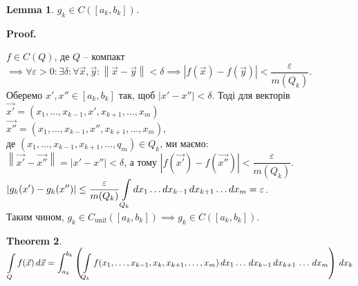\documentclass[a4paper, 10pt]{article}
\makeatletter
\def\qed{$\blacksquare$}
\theoremstyle{theoremdd}
\newtheorem{theorem}{Theorem}[subsection]
\theoremstyle{theoremdd}
\theoremstyle{theoremdd}
\theoremstyle{theoremdd}
\theoremstyle{theoremdd}
\theoremstyle{theoremdd}
\theoremstyle{theoremdd}
\newtheorem{lemma}[theorem]{Lemma}
\theoremstyle{theoremdd}
\renewenvironment{proof}[1][Proof.\\]{\par
\pushQED{\hfill \qed}%
\normalfont \topsep6\p@\@plus6\p@\relax
\trivlist
\item\relax
{\bfseries
#1\@addpunct{.}}\hspace\labelsep\ignorespaces
}{%
\popQED\endtrivlist\@endpefalse
}
\newcommand\Norm[1]{\left\lVert#1\right\rVert}
\makeatother
\begin{document}
\begin{lemma}
$g_k \in C([a_k,b_k])$.
\end{lemma}

\begin{proof}
$f \in C(Q)$, де $Q$ -- компакт $\implies \forall \varepsilon > 0: \exists \delta: \forall \vec{x}, \vec{y}: \Norm{\vec{x} - \vec{y}} < \delta \implies |f(\vec{x}) - f(\vec{y})| < \dfrac{\varepsilon}{m(Q_k)}$.\\
Оберемо $x',x'' \in [a_k,b_k]$ так, щоб $|x'-x''|<\delta$. Тоді для векторів\\
$\vec{x'} = (x_1,\dots,x_{k-1},x',x_{k+1},\dots,x_m)$\\
$\vec{x''} = (x_1,\dots,x_{k-1},x'',x_{k+1},\dots,x_m)$,\\
де $(x_1,\dots,x_{k-1},x_{k+1},\dots,q_m) \in Q_k$, ми маємо:\\
$\Norm{\vec{x'} - \vec{x''}} = |x'-x''| < \delta$, а тому $|f(\vec{x'}) - f(\vec{x''})| < \dfrac{\varepsilon}{m(Q_k)}$.\\
$\displaystyle |g_k(x') - g_k(x'')| \leq \dfrac{\varepsilon}{m(Q_k)} \int\displaylimits_{Q_k} dx_1\dots dx_{k-1}\,dx_{k+1}\dots dx_m = \varepsilon$.\\
Таким чином, $g_k \in C_{\text{unif}}([a_k,b_k]) \implies g_k \in C([a_k,b_k])$.
\end{proof}

\begin{theorem}
$\displaystyle\int\displaylimits_Q f(\vec{x})\,d\vec{x} = \int_{a_k}^{b_k} \left( \int\displaylimits_{Q_k} f(x_1,\dots,x_{k-1},x_k,x_{k+1},\dots,x_m)\,dx_1\dots \,dx_{k-1}\,dx_{k+1}\,\dots\,dx_m \right)\,dx_k$
\end{theorem}

\iffalse
\begin{proof}
Я запишу доведення для випадку функції трьох змінних. Тобто буду доводити, що \\ $\displaystyle\int_Q f(x,y,z)\,dx\,dy\,dz = \int_{a_3}^{b_3} \left(\int\displaylimits_{Q_3} f(x,y,z)\,dx\,dy\right)\,dz$.\\
На вищу розмірність доведення повторюється.
\bigskip \\
$f \in \mathcal{R}(Q)$, тому що вимагали функцію $f \in C(Q)$. Тому $\forall \varepsilon > 0: \exists \lambda: U(f,\lambda) - L(f,\lambda) < \varepsilon$.\\
Розбиття $\lambda$ природним чином розбиває також брус $Q_3$. Маємо:\\
$\displaystyle\int_{a_3}^{b_3} g_3(t)\,dt = \displaystyle\sum_{v_3=1}^{n_3} \int_{z(v_3-1)}^{z(v_3)} g_3(t)\,dt \leq \sum_{v_3=1}^{n_3} \sup_{t \in [z(v_3-1),z(v_3)]} g_3(t) \Delta z(v_3)$
\end{proof}
\fi
\end{document}
